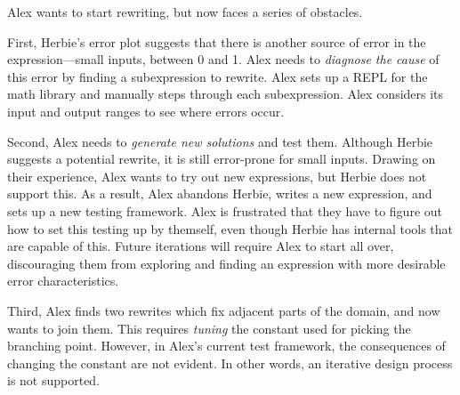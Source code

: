 Alex wants to start rewriting, but now faces a series of obstacles.


First, 
  Herbie's error plot suggests that 
  there is another source of error
  in the expression---small inputs, between 0 and 1.
Alex needs to \textit{diagnose the cause} of this error by finding a subexpression to rewrite.
Alex sets up a REPL for the math library 
  and manually steps through each subexpression.
Alex considers
  its input and output ranges 
  to see where errors occur.

Second, 
  Alex needs to \textit{generate new solutions} and test them.
Although Herbie suggests a potential rewrite,
  it is still error-prone for small inputs.
Drawing on their experience, 
  Alex wants to try out new expressions, 
  but Herbie does not support this.
As a result, Alex abandons Herbie, 
  writes a new expression, 
  and sets up a new testing framework.
Alex is frustrated that 
  they have to figure out how to set this testing up by themself,
  even though Herbie has internal tools that are capable of this.
Future iterations will require Alex to start all over, 
  discouraging them from exploring and 
  finding an expression with more desirable error characteristics. 


Third,
  Alex finds two rewrites which fix adjacent parts of the domain,
  and now wants to join them.
This requires \textit{tuning} the constant used for picking the branching point.
However, in Alex's current test framework,
  the consequences of changing the constant are not evident.
In other words, an iterative design process is not supported.

